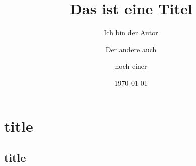 \documentclass[ngerman,%
cd=true,cd=pale,cd=full,
twoside,open=right
]{tudscrreprt}
\begin{document}

\title{Das ist eine Titel}
\author{%
  Ich bin der Autor%
  \and%
  Der andere auch%
  \and
  noch einer
}
\date*{\today}
\let\datetext\empty
{}
\publishers{aaa}
\maketitle[titlesignature]

\noindent\blindtext

\part{title}
\blindtext

\chapter{title}
\blindtext
\end{document}
